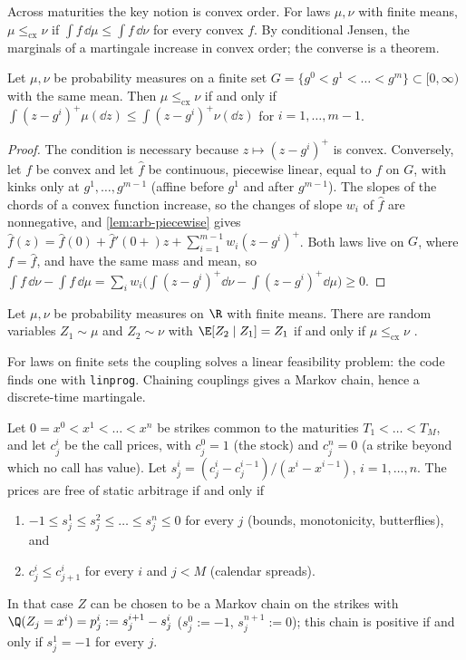 Across maturities the key notion is convex order. For laws $\mu,\nu$ with finite means, $\mu\le_{\mathrm{cx}}\nu$ if
$\int f\,\dd\mu\le\int f\,\dd\nu$ for every convex $f$. By conditional Jensen, the marginals of a martingale
increase in convex order; the converse is a theorem.

\begin{lemma}\label{lem:afs-convex-order}
Let $\mu,\nu$ be probability measures on a finite set $G=\{g^0<g^1<\dots<g^m\}\subset[0,\infty)$ with the same
mean. Then $\mu\le_{\mathrm{cx}}\nu$ if and only if $\int(z-g^i)^+\mu(\dd z)\le\int(z-g^i)^+\nu(\dd z)$ for
$i=1,\dots,m-1$.
\end{lemma}

\begin{proof}
The condition is necessary because $z\mapsto(z-g^i)^+$ is convex. Conversely, let $f$ be convex and let $\hat f$ be
continuous, piecewise linear, equal to $f$ on $G$, with kinks only at $g^1,\dots,g^{m-1}$ (affine before $g^1$
and after $g^{m-1}$). The slopes of the chords of a convex function increase, so the changes of slope $w_i$ of $\hat f$
are nonnegative, and \cref{lem:arb-piecewise} gives $\hat f(z)=\hat f(0)+\hat f'(0+)z+\sum_{i=1}^{m-1}w_i(z-g^i)^+$. Both
laws live on $G$, where $f=\hat f$, and have the same mass and mean, so
$\int f\,\dd\nu-\int f\,\dd\mu=\sum_iw_i\big(\int(z-g^i)^+\dd\nu-\int(z-g^i)^+\dd\mu\big)\ge0$.
\end{proof}

\begin{lemma}[Strassen]\label{lem:afs-strassen}
Let $\mu,\nu$ be probability measures on $\R$ with finite means. There are random variables $Z_1\sim\mu$ and
$Z_2\sim\nu$ with $\E[Z_2\mid Z_1]=Z_1$ if and only if $\mu\le_{\mathrm{cx}}\nu$ \citep[Theorem~8]{strassen-1965}.
\end{lemma}

For laws on finite sets the coupling solves a linear feasibility problem: the code finds one with
\texttt{linprog}. Chaining couplings gives a Markov chain, hence a discrete-time martingale.

\begin{theorem}\label{thm:afs-grid}
Let $0=x^0<x^1<\dots<x^n$ be strikes common to the maturities $T_1<\dots<T_M$, and let $c_j^i$ be the call prices,
with $c_j^0=1$ (the stock) and $c_j^n=0$ (a strike beyond which no call has value). Let
$s_j^i=(c_j^i-c_j^{i-1})/(x^i-x^{i-1})$, $i=1,\dots,n$. The prices are free of static arbitrage if and only if
\begin{enumerate}[label=(\alph*)]
  \item $-1\le s_j^1\le s_j^2\le\dots\le s_j^n\le0$ for every $j$ (bounds, monotonicity, butterflies), and
  \item $c_j^i\le c_{j+1}^i$ for every $i$ and $j<M$ (calendar spreads).
\end{enumerate}
In that case $Z$ can be chosen to be a Markov chain on the strikes with $\Q(Z_j=x^i)=p_j^i:=s_j^{i+1}-s_j^i$
($s_j^0:=-1$, $s_j^{n+1}:=0$); this chain is positive if and only if $s_j^1=-1$ for every $j$.
\end{theorem}

